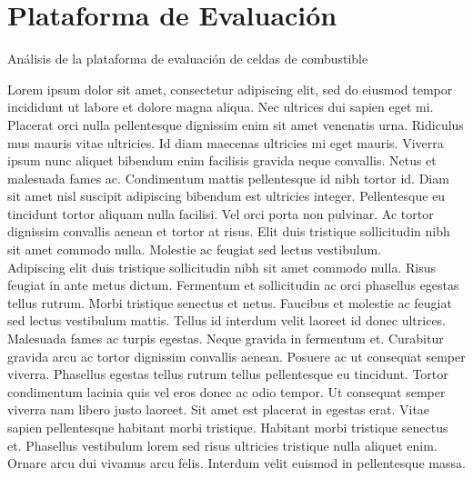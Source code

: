 \section{Plataforma de Evaluación}

\vspace{0.5cm}

\Large\scshape
\begin{center}
    Análisis de la plataforma de evaluación de celdas de combustible
\end{center}
\normalfont

\divider

Lorem ipsum dolor sit amet, consectetur adipiscing elit, sed do eiusmod tempor incididunt ut labore et dolore magna aliqua. Nec ultrices dui sapien eget mi. Placerat orci nulla pellentesque dignissim enim sit amet venenatis urna. Ridiculus mus mauris vitae ultricies. Id diam maecenas ultricies mi eget mauris. Viverra ipsum nunc aliquet bibendum enim facilisis gravida neque convallis. Netus et malesuada fames ac. Condimentum mattis pellentesque id nibh tortor id. Diam sit amet nisl suscipit adipiscing bibendum est ultricies integer. Pellentesque eu tincidunt tortor aliquam nulla facilisi. Vel orci porta non pulvinar. Ac tortor dignissim convallis aenean et tortor at risus. Elit duis tristique sollicitudin nibh sit amet commodo nulla. Molestie ac feugiat sed lectus vestibulum.\\

Adipiscing elit duis tristique sollicitudin nibh sit amet commodo nulla. Risus feugiat in ante metus dictum. Fermentum et sollicitudin ac orci phasellus egestas tellus rutrum. Morbi tristique senectus et netus. Faucibus et molestie ac feugiat sed lectus vestibulum mattis. Tellus id interdum velit laoreet id donec ultrices. Malesuada fames ac turpis egestas. Neque gravida in fermentum et. Curabitur gravida arcu ac tortor dignissim convallis aenean. Posuere ac ut consequat semper viverra. Phasellus egestas tellus rutrum tellus pellentesque eu tincidunt. Tortor condimentum lacinia quis vel eros donec ac odio tempor. Ut consequat semper viverra nam libero justo laoreet. Sit amet est placerat in egestas erat. Vitae sapien pellentesque habitant morbi tristique. Habitant morbi tristique senectus et. Phasellus vestibulum lorem sed risus ultricies tristique nulla aliquet enim. Ornare arcu dui vivamus arcu felis. Interdum velit euismod in pellentesque massa.\\